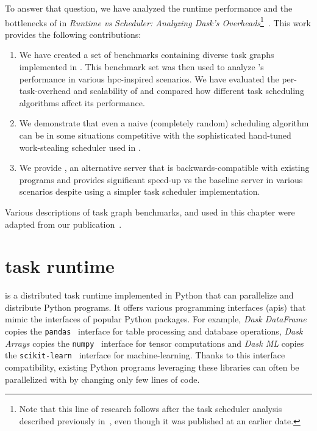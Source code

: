 To answer that question, we have analyzed the runtime performance and the bottlenecks of
\dask{} in
\emph{Runtime vs Scheduler: Analyzing Dask's Overheads}\footnote{Note that this line of research follows after the task scheduler analysis described previously
in~, even though it was published at an earlier date.}~\cite{rsds}. This work
provides the following contributions:
\begin{enumerate}[itemsep=2pt]
	\item We have created a set of benchmarks containing diverse task graphs implemented in
	      \dask{}. This benchmark set was then used to analyze \dask{}'s
	      performance in various \gls{hpc}-inspired scenarios. We have evaluated the
	      per-task-overhead and scalability of \dask{} and compared how different task
	      scheduling algorithms affect its performance.
	\item We demonstrate that even a naive (completely random) scheduling algorithm can be in some situations
	      competitive with the sophisticated hand-tuned work-stealing scheduler used in
	      \dask{}.
	\item We provide \rsds{}, an alternative \dask{} server that is
	      backwards-compatible with existing \dask{} programs and provides significant
	      speed-up vs the baseline \dask{} server in various scenarios despite using a
	      simpler task scheduler implementation.
\end{enumerate}

Various descriptions of task graph benchmarks, \dask{} and
\rsds{} used in this chapter were adapted from our
publication~\cite{rsds}.


\section{\dask{} task runtime}
\label{sec:rsds-dask}
\dask{} is a distributed task runtime implemented in Python that can
parallelize and distribute Python programs. It offers various programming interfaces
(\glspl{api}) that mimic the interfaces of popular Python packages. For example,
\emph{Dask DataFrame} copies the \texttt{pandas}~\cite{pandas}
interface for table processing and database operations, \emph{Dask Arrays} copies the
\texttt{numpy}~\cite{numpy} interface for tensor computations and
\emph{Dask ML} copies the \texttt{scikit-learn}~\cite{scikit-learn}
interface for machine-learning. Thanks to this interface compatibility, existing Python programs
leveraging these libraries can often be parallelized with \dask{} by changing
only few lines of code.

